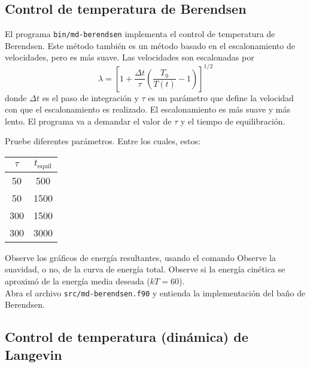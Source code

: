 
\subsection{Control de temperatura de Berendsen}

El programa {\tt bin/md-berendsen} implementa el control de temperatura
de Berendsen. Este método también es un método basado en el
escalonamiento de velocidades, pero es más suave. Las velocidades son
escalonadas por
\[
\lambda = \left[  
1 + \frac{\Delta t}{\tau} \left(
\frac{T_0}{T(t)} -1
\right)
\right]^{1/2}
\]
donde $\Delta t$ es el paso de integración y $\tau$ es un parámetro que
define la velocidad con que el escalonamiento es realizado. El
escalonamiento es más suave y más lento. El programa va a demandar el
valor de $\tau$ y el tiempo de equilibración. 

Pruebe diferentes parámetros. Entre los cuales, estos: 
{\tt \begin{center}\begin{tabular}{cc}
\hline
  $\tau$ & $t_{\mathrm{equil}}$ \\
\hline
    50   &  500 \\
    50   &  1500 \\
   300   &  1500 \\
   300   &  3000 \\
\hline
\end{tabular}\end{center}}
Observe los gráficos de energía resultantes, usando el comando
Observe la suavidad, o no, de la curva de energía total. Observe si la
energía cinética se aproximó de la energía media deseada ($kT=60$).\\

\noindent
Abra el archivo {\tt src/md-berendsen.f90} y entienda la implementación
del baño de Berendsen.

\subsection{Control de temperatura (dinámica) de Langevin}

